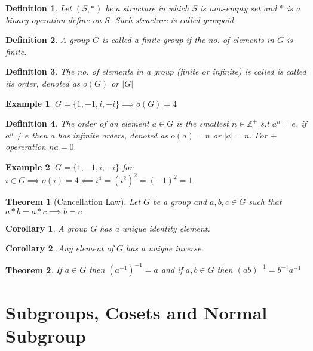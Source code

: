 \documentclass[12pt,a4paper]{article}
\newcommand{\Z}{\mathbb{Z}}
\newtheorem{thm}{Theorem}
\newtheorem*{defn}{Definition}
\newtheorem*{cor}{Corollary}
\newtheorem{ex}{Example}
\begin{document}
\begin{defn}\normalfont
	Let $(S,*)$ be a structure in which $S$ is non-empty set and $*$ is a binary operation define on $S$. Such structure is called groupoid.
\end{defn}

\begin{defn}\normalfont
	A group $G$ is called a finite group if the no. of elements in $G$ is finite.
\end{defn}
\begin{defn}\normalfont
	The no. of elements in a group (finite or infinite) is called is called its order, denoted as $o(G)$ or $|G|$
\end{defn}
\begin{ex}
	$G=\{1,-1,i,-i\} \implies o(G)=4$ 
\end{ex}
\begin{defn}\normalfont
	The order of an element $a \in G$ is the smallest $n \in \Z^+$ s.t $a^n=e$, if $a^n \ne e$ then $a$ has infinite orders, denoted as $o(a)=n$ or $|a|=n$. For $+$ opereration $na=0.$
\end{defn}
\begin{ex}
	$G=\{1,-1,i,-i\}$ for $i \in G \implies o(i)=4 \impliedby i^4=(i^2)^2=(-1)^2=1$
\end{ex}

\begin{thm}[Cancellation Law]
	  Let $G$ be a group and $a,b,c\in G$ such that $a*b=a*c \implies b=c$
\end{thm}
\begin{cor}\normalfont
	A group $G$ has a unique identity element.
\end{cor}
\begin{cor}\normalfont
	Any element of $G$ has a unique inverse.
\end{cor}
\begin{thm} 
	If $a\in G$ then $(a^{-1})^{-1}=a$ and if $a,b\in G$ then $(ab)^{-1}=b^{-1}a^{-1}$
\end{thm}


\section{Subgroups, Cosets and Normal Subgroup}
\end{document}
